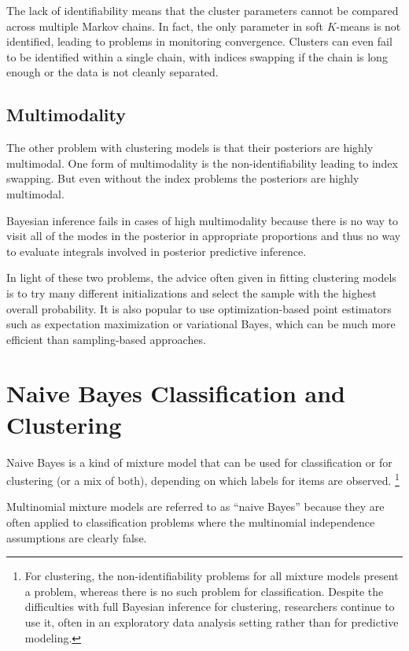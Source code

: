 The lack of identifiability means that the cluster parameters
cannot be compared across multiple Markov chains.  In fact, the only
parameter in soft $K$-means is not identified, leading to problems in
monitoring convergence.  Clusters can even fail to be identified
within a single chain, with indices swapping if the chain is long
enough or the data is not cleanly separated.

\subsection{Multimodality}

The other problem with clustering models is that their posteriors are
highly multimodal.  One form of multimodality is the
non-identifiability leading to index swapping.  But even without
the index problems the posteriors are highly multimodal.

Bayesian inference fails in cases of high multimodality because there
is no way to visit all of the modes in the posterior in appropriate
proportions and thus no way to evaluate integrals involved in
posterior predictive inference.

In light of these two problems, the advice often given in fitting
clustering models is to try many different initializations and select
the sample with the highest overall probability.  It is also popular
to use optimization-based point estimators such as expectation
maximization or variational Bayes, which can be much more efficient
than sampling-based approaches.


\section{Naive Bayes Classification and Clustering}

Naive Bayes is a kind of mixture model that can be used for
classification or for clustering (or a mix of both), depending on
which labels for items are observed.%
%
\footnote{For clustering, the non-identifiability problems for all
  mixture models present a problem, whereas there is no such problem
  for classification.  Despite the difficulties with full Bayesian
  inference for clustering, researchers continue to use it, often in
  an exploratory data analysis setting rather than for predictive
  modeling.}

Multinomial mixture models are referred to as ``naive Bayes'' because
they are often applied to classification problems where the
multinomial independence assumptions are clearly false.

